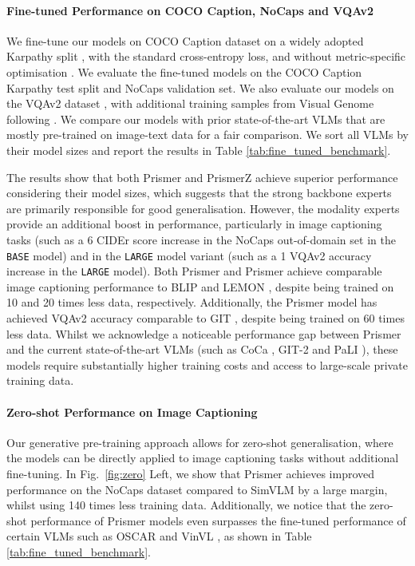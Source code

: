 \documentclass[11pt]{article}
\begin{document}
{\paragraph{Fine-tuned Performance on COCO Caption, NoCaps and VQAv2} We fine-tune our models on COCO Caption dataset \cite{chen2015coco_caption} on a widely adopted Karpathy split \cite{karpathy2015coco_karpathy}, with the standard cross-entropy loss, and without metric-specific optimisation \cite{vedantam2015cider}. We evaluate the fine-tuned models on the COCO Caption Karpathy test split and NoCaps \cite{agrawal2019nocaps} validation set. We also evaluate our models on the VQAv2 dataset \cite{antol2015vqa}, with additional training samples from Visual Genome \cite{krishna17visualgenome} following \cite{li2022blip}. We compare our models with prior state-of-the-art VLMs that are mostly pre-trained on image-text data for a fair comparison. We sort all VLMs by their model sizes and report the results in Table \ref{tab:fine_tuned_benchmark}. 

The results show that both Prismer and PrismerZ achieve superior performance considering their model sizes, which suggests that the strong backbone experts are primarily responsible for good generalisation. However, the modality experts provide an additional boost in performance, particularly in image captioning tasks (such as a 6 CIDEr score increase in the NoCaps out-of-domain set in the {\tt BASE} model) and in the {\tt LARGE} model variant (such as a 1 VQAv2 accuracy increase in the {\tt LARGE} model). Both Prismer and Prismer achieve comparable image captioning performance to BLIP \cite{li2022blip} and LEMON \cite{hu2022lemon}, despite being trained on 10 and 20 times less data, respectively. Additionally, the Prismer model has achieved VQAv2 accuracy comparable to GIT \cite{wang2022git}, despite being trained on 60 times less data. Whilst we acknowledge a noticeable performance gap between Prismer and the current state-of-the-art VLMs (such as CoCa \cite{yu2022coca}, GIT-2 \cite{wang2022git} and PaLI \cite{chen2022pali}), these models require substantially higher training costs and access to large-scale private training data.


\paragraph{Zero-shot Performance on Image Captioning} Our generative pre-training approach allows for zero-shot generalisation, where the models can be directly applied to image captioning tasks without additional fine-tuning. In Fig.~\ref{fig:zero} Left, we show that Prismer achieves improved performance on the NoCaps dataset compared to SimVLM \cite{wang2021simvlm} by a large margin, whilst using 140 times less training data. Additionally, we notice that the zero-shot performance of Prismer models even surpasses the fine-tuned performance of certain VLMs such as OSCAR \cite{li2020oscar} and VinVL \cite{zhang2021vinvl}, as shown in Table \ref{tab:fine_tuned_benchmark}. 

}
\end{document}
